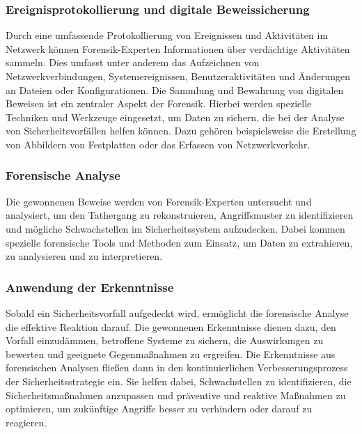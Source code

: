 \subsubsection{Ereignisprotokollierung und digitale Beweissicherung}
Durch eine umfassende Protokollierung von Ereignissen und Aktivitäten im Netzwerk können Forensik-Experten Informationen über verdächtige Aktivitäten sammeln. Dies umfasst unter anderem das Aufzeichnen von Netzwerkverbindungen, Systemereignissen, Benutzeraktivitäten und Änderungen an Dateien oder Konfigurationen.
Die Sammlung und Bewahrung von digitalen Beweisen ist ein zentraler Aspekt der Forensik. Hierbei werden spezielle Techniken und Werkzeuge eingesetzt, um Daten zu sichern, die bei der Analyse von Sicherheitsvorfällen helfen können. Dazu gehören beispielsweise die Erstellung von Abbildern von Festplatten oder das Erfassen von Netzwerkverkehr.

\subsubsection{Forensische Analyse}
Die gewonnenen Beweise werden von Forensik-Experten untersucht und analysiert, um den Tathergang zu rekonstruieren, Angriffsmuster zu identifizieren und mögliche Schwachstellen im Sicherheitssystem aufzudecken. Dabei kommen spezielle forensische Tools und Methoden zum Einsatz, um Daten zu extrahieren, zu analysieren und zu interpretieren.

\subsubsection{Anwendung der Erkenntnisse}
Sobald ein Sicherheitsvorfall aufgedeckt wird, ermöglicht die forensische Analyse die effektive Reaktion darauf. Die gewonnenen Erkenntnisse dienen dazu, den Vorfall einzudämmen, betroffene Systeme zu sichern, die Auswirkungen zu bewerten und geeignete Gegenmaßnahmen zu ergreifen.
Die Erkenntnisse aus forensischen Analysen fließen dann in den kontinuierlichen Verbesserungsprozess der Sicherheitsstrategie ein. Sie helfen dabei, Schwachstellen zu identifizieren, die Sicherheitsmaßnahmen anzupassen und präventive und reaktive Maßnahmen zu optimieren, um zukünftige Angriffe besser zu verhindern oder darauf zu reagieren.



